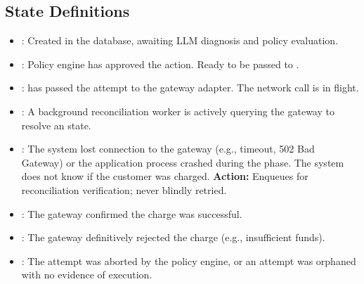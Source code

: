 \vspace{0.5cm}

\subsection{State Definitions}

\begin{tcolorbox}[featurebox={Active States}]
\begin{itemize}
    \item {}: Created in the database, awaiting LLM diagnosis and policy evaluation.
    \item {}: Policy engine has approved the action. Ready to be passed to .
    \item {}:  has passed the attempt to the gateway adapter. The network call is in flight.
    \item {}: A background reconciliation worker is actively querying the gateway to resolve an  state.
\end{itemize}
\end{tcolorbox}

\begin{tcolorbox}[warningbox={The Ambiguous State}]
\begin{itemize}
    \item {}: The system lost connection to the gateway (e.g., timeout, 502 Bad Gateway) or the application process crashed during the  phase. The system does not know if the customer was charged. \textbf{Action:} Enqueues for reconciliation verification; never blindly retried.
\end{itemize}
\end{tcolorbox}

\begin{tcolorbox}[successbox={Terminal States}]
\begin{itemize}
    \item {}: The gateway confirmed the charge was successful.
    \item {}: The gateway definitively rejected the charge (e.g., insufficient funds).
    \item {}: The attempt was aborted by the policy engine, or an  attempt was orphaned with no evidence of execution.
\end{itemize}
\end{tcolorbox}

